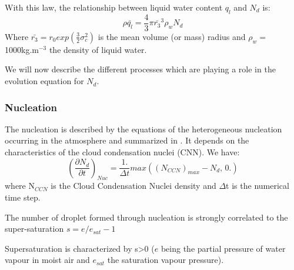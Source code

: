 With this law, the relationship between liquid water content $q_{l}$ and
$N_{d}$ is:
\begin{equation}
\rho \bar{q_{l}}=\frac{4}{3}\pi \bar{r_{3}}^{3}\rho_{w}N_{d}
\end{equation}
Where $\bar{r_{3}}=r_{0}exp\left( \frac{3}{2}\sigma_{c}^{2}
\right)$ is the mean volume (or mass) radius and $\rho
_{w}=$1000kg.m$^{-3}$ the density of liquid water.

We will now describe the different processes which are playing a role in the
evolution equation for $N_{d}$.

\subsubsection{Nucleation}
The nucleation is described by the equations of the heterogeneous nucleation
occurring in the atmosphere and summarized in
\cite{Pruppacher:2000}. It depends on the characteristics of the cloud condensation nuclei
(CNN). We have:
\begin{equation}
\left( \frac{\partial N_{d}}{\partial t} \right)_{Nuc}=\frac{1.}{\Delta
t}max\left( \left( N_{CCN} \right)_{max}-N_{d},\, 0. \right)
\end{equation}
where N$_{CCN}$ is the Cloud Condensation Nuclei density and $\Delta $t is
the numerical time step.

The number of droplet formed through nucleation is strongly correlated to
the super-saturation
\newline
$s = e/e_{sat} -1$

 Supersaturation is characterized by s\textgreater 0
($e$ being the partial pressure of water vapour in moist
air and $e_{sat}$ the saturation vapour pressure).

